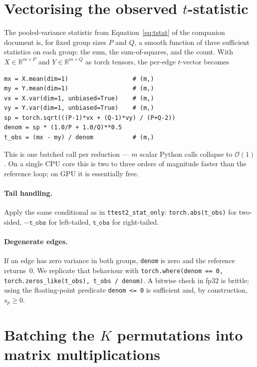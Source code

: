 \documentclass[11pt]{article}
\begin{document}
\section{Vectorising the observed $t$-statistic}

The pooled-variance statistic from Equation~\eqref{eq:tstat} of the companion document is, for fixed group sizes $P$ and $Q$, a smooth function of three sufficient statistics on each group: the sum, the sum-of-squares, and the count. With $X \in \mathbb{R}^{m\times P}$ and $Y \in \mathbb{R}^{m\times Q}$ as torch tensors, the per-edge $t$-vector becomes

\begin{lstlisting}
mx = X.mean(dim=1)                  # (m,)
my = Y.mean(dim=1)                  # (m,)
vx = X.var(dim=1, unbiased=True)    # (m,)
vy = Y.var(dim=1, unbiased=True)    # (m,)
sp = torch.sqrt(((P-1)*vx + (Q-1)*vy) / (P+Q-2))
denom = sp * (1.0/P + 1.0/Q)**0.5
t_obs = (mx - my) / denom           # (m,)
\end{lstlisting}

This is one batched call per reduction --- $m$ scalar Python calls collapse to $\mathcal{O}(1)$. On a single CPU core this is two to three orders of magnitude faster than the reference loop; on GPU it is essentially free.

\paragraph{Tail handling.} Apply the same conditional as in \texttt{ttest2\_stat\_only}: \texttt{torch.abs(t\_obs)} for two-sided, $-\texttt{t\_obs}$ for left-tailed, $\texttt{t\_obs}$ for right-tailed.

\paragraph{Degenerate edges.} If an edge has zero variance in both groups, \texttt{denom} is zero and the reference returns~0. We replicate that behaviour with \texttt{torch.where(denom == 0, torch.zeros\_like(t\_obs), t\_obs / denom)}. A bitwise check in fp32 is brittle; using the floating-point predicate \texttt{denom <= 0} is sufficient and, by construction, $s_p \ge 0$.

\section{Batching the $K$ permutations into matrix multiplications}
\end{document}
